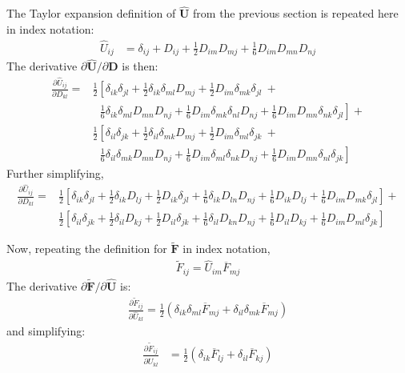 The Taylor expansion definition of $\hat{\bm U}$ from the previous section is repeated here in index notation:
\begin{align}
\hat{U}_{ij} &= \delta_{ij} + D_{ij} + \frac{1}{2}D_{im}D_{mj} + \frac{1}{6}D_{im}D_{mn}D_{nj}
\end{align}
The derivative $\partial \hat{\bm U}/{\partial {\bm D}}$ is then:
\begin{equation}
\begin{split}
\frac{\partial \hat{U}_{ij}}{\partial D_{kl}} = &\frac{1}{2}\left[\delta_{ik}\delta_{jl} + \frac{1}{2}\delta_{ik}\delta_{ml}D_{mj} + \frac{1}{2}D_{im}\delta_{mk}\delta_{jl}\  + \right.\\
&\ \left.\ \ \frac{1}{6}\delta_{ik}\delta_{ml}D_{mn}D_{nj} + \frac{1}{6}D_{im}\delta_{mk}\delta_{nl}D_{nj} + \frac{1}{6}D_{im}D_{mn}\delta_{nk}\delta_{jl}\right] + \\
&\frac{1}{2}\left[\delta_{il}\delta_{jk} + \frac{1}{2}\delta_{il}\delta_{mk}D_{mj} + \frac{1}{2}D_{im}\delta_{ml}\delta_{jk}\  + \right.\\
&\ \left.\ \ \frac{1}{6}\delta_{il}\delta_{mk}D_{mn}D_{nj} + \frac{1}{6}D_{im}\delta_{ml}\delta_{nk}D_{nj} + \frac{1}{6}D_{im}D_{mn}\delta_{nl}\delta_{jk}\right]
\end{split}
\end{equation}
Further simplifying,
\begin{align}
\frac{\partial \hat{U}_{ij}}{\partial D_{kl}} = &\frac{1}{2}\left[\delta_{ik}\delta_{jl} + \frac{1}{2}\delta_{ik}D_{lj} + \frac{1}{2}D_{ik}\delta_{jl} + \frac{1}{6}\delta_{ik}D_{ln}D_{nj} + \frac{1}{6}D_{ik}D_{lj} + \frac{1}{6}D_{im}D_{mk}\delta_{jl}\right] + \\
&\frac{1}{2}\left[\delta_{il}\delta_{jk} + \frac{1}{2}\delta_{il}D_{kj} + \frac{1}{2}D_{il}\delta_{jk} + \frac{1}{6}\delta_{il}D_{kn}D_{nj} + \frac{1}{6}D_{il}D_{kj} + \frac{1}{6}D_{im}D_{ml}\delta_{jk}\right]
\end{align}

Now, repeating the definition for $\tilde {\bm F}$ in index notation,
\begin{align}
\tilde{F}_{ij} = \hat{U}_{im}\overline{F}_{mj}
\end{align}
The derivative ${\partial \tilde{\bm F}}/{\partial \hat{\bm U}}$ is:
\begin{align}
\frac{\partial \tilde{F}_{ij}}{\partial \hat{U}_{kl}} = \frac{1}{2}\left(\delta_{ik}\delta_{ml}\overline{F}_{mj} + \delta_{il}\delta_{mk}\overline{F}_{mj}\right)
\end{align}
and simplifying:
\begin{align}
\frac{\partial \tilde{F}_{ij}}{\partial \hat{U}_{kl}} &= \frac{1}{2}\left(\delta_{ik}\overline{F}_{lj} + \delta_{il}\overline{F}_{kj}\right)
\end{align}

